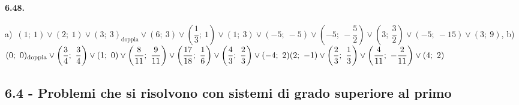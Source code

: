 \paragraph{6.48.} 
a)~\((1;~1)\vee(2;~1)\vee(3;~3)_\text{doppia}\vee(6;~3)\vee\left(\dfrac 1 
3;~1\right)\vee(1;~3)\vee(-5;~-5)\vee\left(-5;~-\dfrac 5 
2\right)\vee\left(3;~\dfrac 3 
2\right)\vee(-5;~-15)\vee(3;~9)\),\quad 
b)~\((0;~0)_\text{doppia} \vee
\left(\dfrac 3 4;~\dfrac 3 4\right)\vee
(1;~0)\vee
\left(\dfrac {8}{11};~\dfrac {9}{11}\right)\vee
\left(\dfrac{17}{18};~\dfrac 1 6\right)\vee
\left(\dfrac 4 3;~\dfrac 2 3\right)\vee\protect\\
(-4;~2)(2;~-1)\vee
\left(\dfrac 2 3;~\dfrac 1 3\right)\vee
\left(\dfrac 4{11};~-\dfrac 2{11}\right)\vee
(4;~2)\)

\pagebreak %
\subsection*{6.4 - Problemi che si risolvono con sistemi di grado 
superiore al 
primo}

